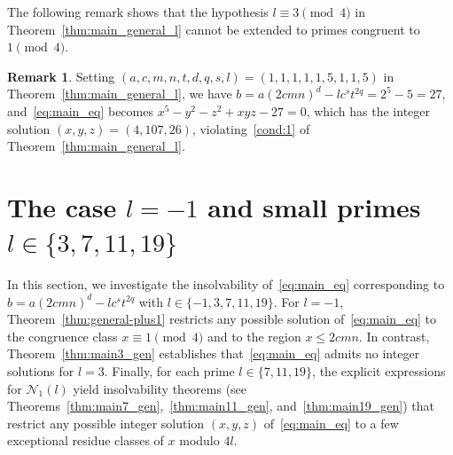 \documentclass[11pt,a4paper]{amsart}
\theoremstyle{plain}
\theoremstyle{definition}
\newtheorem{remark}[theorem]{Remark}
\begin{document}
The following remark shows that the hypothesis $l \equiv 3 \pmod 4$ in Theorem~\ref{thm:main_general_l} cannot be extended to primes congruent to $1\pmod{4}$. 
\begin{remark}\label{imposibillity l5}
Setting $(a,c,m,n,t,d,q,s,l) = (1,1,1,1,1,5,1,1,5)$ in Theorem~\ref{thm:main_general_l}, we have $b = a (2cmn)^{d} -
l c^{s} t^{2q} = 2^{5} - 5 = 27$, and~\eqref{eq:main_eq} becomes
$  x^5 - y^2 - z^2 + xyz - 27 = 0$, which has the integer solution $(x,y,z) = (4,107,26)$, violating~\ref{cond:1} of Theorem~\ref{thm:main_general_l}.
\end{remark}

\section{The case \texorpdfstring{$l = -1$}{l = -1} and small primes \texorpdfstring{$l \in \{3,7, 11, 19\}$}{l = 3,7, 11, 19}}\label{sec:smallprimes}
In this section, we investigate the insolvability of~\eqref{eq:main_eq} corresponding to $b = a (2 c m n)^{d} - l c^{s} t^{2q}$ with $l \in \{-1, 3, 7, 11, 19\}$. For $l = -1$, Theorem~\ref{thm:general-plus1} restricts any possible solution of~\eqref{eq:main_eq} to the congruence class $x \equiv 1 \pmod 4$ and to the region $x \le 2cmn$. In contrast, Theorem~\ref{thm:main3_gen} establishes that~\eqref{eq:main_eq} admits no integer solutions for $l = 3$. Finally, for each prime $l\in\{7,11,19\}$, the explicit expressions for $\mathcal{N}_1(l)$ yield insolvability theorems (see Theorems~\ref{thm:main7_gen},~\ref{thm:main11_gen}, and~\ref{thm:main19_gen}) that restrict any possible integer solution $(x,y,z)$ of~\eqref{eq:main_eq} to a few exceptional residue classes of  $x$  modulo $4l$.
\end{document}
